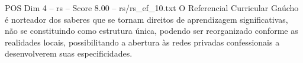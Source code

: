 \begin{textsample}{POS Dim 4 – rs – Score 8.00 – rs/rs\_ef\_10.txt}
O Referencial Curricular Gaúcho é norteador dos saberes que se tornam direitos de aprendizagem significativas, não se constituindo como estrutura única, podendo ser reorganizado conforme as realidades locais, possibilitando a abertura às redes privadas confessionais a desenvolverem suas especificidades.

\end{textsample}
